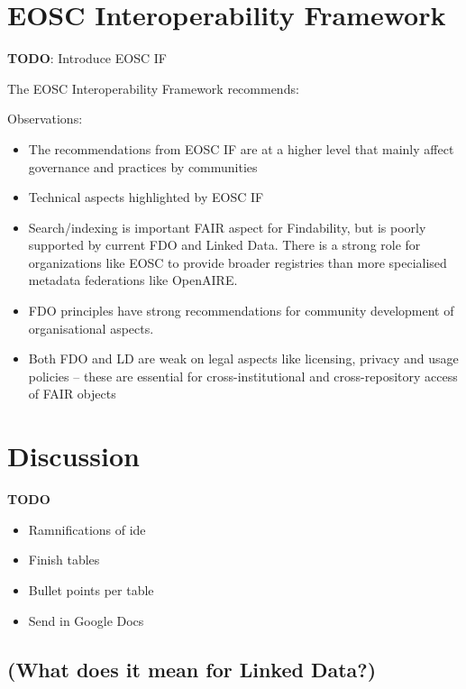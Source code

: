 \documentclass[fleqn,10pt,lineno]{wlpeerjlua}
\providecommand{\tightlist}{%
  \setlength{\itemsep}{0pt}\setlength{\parskip}{0pt}}
\begin{document}
\hypertarget{eosc-interoperability-framework}{%
\section*{EOSC Interoperability Framework}\label{eosc-interoperability-framework}}

\textbf{TODO}: Introduce EOSC IF

The EOSC Interoperability Framework \autocite[][section 3.6]{corchoEOSCInteroperabilityFramework2021b} recommends:



Observations:

\begin{itemize}
\tightlist
\item
  The recommendations from EOSC IF are at a higher level that mainly affect governance and practices by communities
\item
  Technical aspects highlighted by EOSC IF
\item
  Search/indexing is important FAIR aspect for Findability, but is poorly supported by current FDO and Linked Data. There is a strong role for organizations like EOSC to provide broader registries than more specialised metadata federations like OpenAIRE.
\item
  FDO principles have strong recommendations for community development of organisational aspects.
\item
  Both FDO and LD are weak on legal aspects like licensing, privacy and usage policies -- these are essential for cross-institutional and cross-repository access of FAIR objects
\end{itemize}

\hypertarget{sec:discussion}{%
\section*{Discussion}\label{sec:discussion}}

\textbf{TODO}

\begin{itemize}
\tightlist
\item
  Ramnifications of ide
\item
  Finish tables
\item
  Bullet points per table
\item
  Send in Google Docs
\end{itemize}

\hypertarget{what-does-it-mean-for-linked-data}{%
\subsection*{(What does it mean for Linked Data?)}\label{what-does-it-mean-for-linked-data}}
\end{document}
